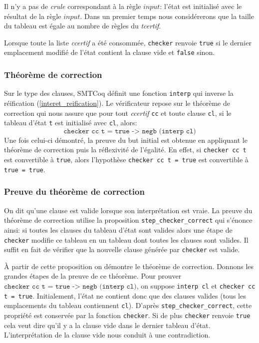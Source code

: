 \documentclass[11pt]{article}
\begin{document}
Il n'y a pas de \textit{crule} correspondant à la règle $input$: l'état est initialisé avec le résultat de la règle $input$. Dans un premier temps nous considérerons que la taille du tableau est égale au nombre de règles du \textit{tcertif}.\medbreak

Lorsque toute la liste \textit{ccertif} a été consommée, \texttt{checker} renvoie \texttt{true} si le dernier emplacement modifié de l'état contient la clause vide et \texttt{false} sinon.

\subsubsection{Théorème de correction}

Sur le type des clauses, SMTCoq définit une fonction \texttt{interp} qui inverse la réification (\ref{interet_reification}). Le vérificateur repose sur le théorème de correction qui nous assure que pour tout \textit{ccertif} \texttt{cc} et toute clause \texttt{cl}, si le tableau d'état \texttt{t} est initialisé avec \texttt{cl},  alors: 
\[ \texttt{checker cc t = true -> negb (interp cl)} \]
 Une fois celui-ci démontré, la preuve du but initial est obtenue en appliquant le théorème de correction puis la réflexivité de l'égalité. En effet, si \texttt{checker cc t} est convertible à \texttt{true}, alors l'hypothèse \texttt{checker cc t = true} est convertible à \texttt{true = true}.

\subsubsection{Preuve du théorème de correction} \label{preuve_correction}

On dit qu'une clause est valide lorsque son interprétation est vraie. La preuve du théorème de correction utilise la proposition \texttt{step\_checker\_correct} qui s'énonce ainsi: si toutes les clauses du tableau d'état sont valides alors une étape de \texttt{checker} modifie ce tableau en un tableau dont toutes les clauses sont valides. Il suffit en fait de vérifier que la nouvelle clause générée par \texttt{checker} est valide. \medbreak

À partir de cette proposition on démontre le théorème de correction. Donnons les grandes étapes de la preuve de ce théorème. Pour prouver $\texttt{checker cc t = true -> negb (interp cl)}$, on suppose \texttt{interp cl} et \texttt{checker cc t = true}. Initialement, l'état ne contient donc que des clauses valides (tous les emplacements du tableau contiennent \texttt{cl}). D'après \texttt{step\_checker\_correct}, cette propriété est conservée par la fonction \texttt{checker}. Si de plus \texttt{checker} renvoie \texttt{true} cela veut dire qu'il y a la clause vide dans le dernier tableau d'état. L'interprétation de la clause vide nous conduit à une contradiction.
\end{document}
